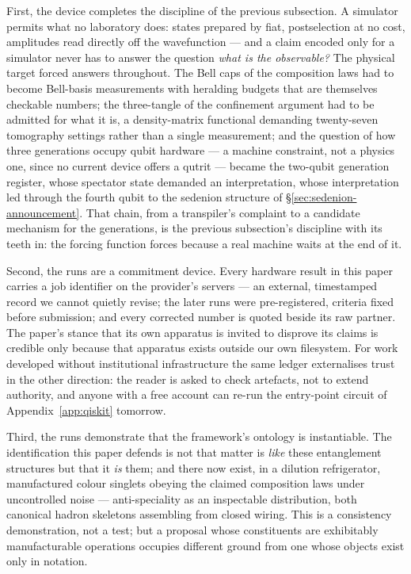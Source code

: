 First, the device completes the discipline of the previous subsection. A simulator permits what
no laboratory does: states prepared by fiat, postselection at no cost, amplitudes read directly
off the wavefunction --- and a claim encoded only for a simulator never has to answer the
question \emph{what is the observable?} The physical target forced answers throughout. The Bell
caps of the composition laws had to become Bell-basis measurements with heralding budgets that
are themselves checkable numbers; the three-tangle of the confinement argument had to be admitted
for what it is, a density-matrix functional demanding twenty-seven tomography settings rather
than a single measurement; and the question of how three generations occupy qubit hardware --- a
machine constraint, not a physics one, since no current device offers a qutrit --- became the
two-qubit generation register, whose spectator state demanded an interpretation, whose
interpretation led through the fourth qubit to the sedenion structure of
\S\ref{sec:sedenion-announcement}. That chain, from a transpiler's complaint to a candidate
mechanism for the generations, is the previous subsection's discipline with its teeth in: the
forcing function forces because a real machine waits at the end of it.

Second, the runs are a commitment device. Every hardware result in this paper carries a job
identifier on the provider's servers --- an external, timestamped record we cannot quietly
revise; the later runs were pre-registered, criteria fixed before submission; and every corrected
number is quoted beside its raw partner. The paper's stance that its own apparatus is invited to
disprove its claims is credible only because that apparatus exists outside our own filesystem.
For work developed without institutional infrastructure the same ledger externalises trust in the
other direction: the reader is asked to check artefacts, not to extend authority, and anyone with
a free account can re-run the entry-point circuit of Appendix~\ref{app:qiskit} tomorrow.

Third, the runs demonstrate that the framework's ontology is instantiable. The identification
this paper defends is not that matter is \emph{like} these entanglement structures but that it
\emph{is} them; and there now exist, in a dilution refrigerator, manufactured colour singlets
obeying the claimed composition laws under uncontrolled noise --- anti-speciality as an
inspectable distribution, both canonical hadron skeletons assembling from closed wiring. This is
a consistency demonstration, not a test; but a proposal whose constituents are exhibitably
manufacturable operations occupies different ground from one whose objects exist only in
notation.

